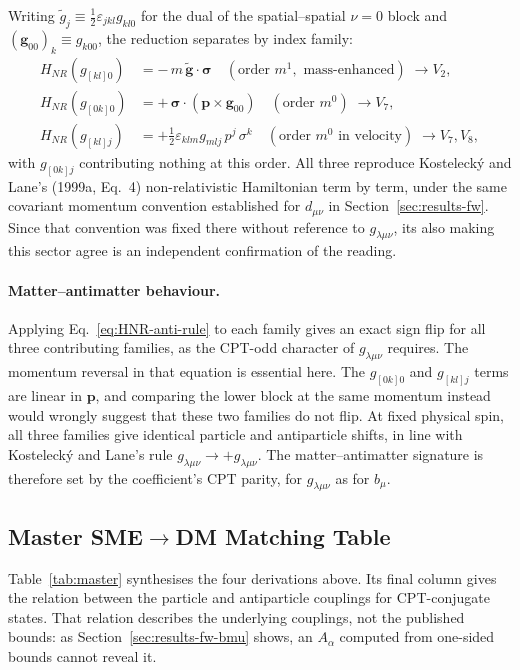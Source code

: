 Writing $\tilde g_j\equiv\tfrac12\varepsilon_{jkl}g_{kl0}$ for the dual of
the spatial--spatial $\nu=0$ block and $(\mathbf g_{00})_k\equiv g_{k00}$,
the reduction separates by index family:
\begin{align}
  H_{NR}(g_{[kl]0}) &= -\,m\,\tilde{\mathbf g}\cdot\boldsymbol\sigma
     \quad (\text{order } m^1,\text{ mass-enhanced}) \;\to V_2, \\
  H_{NR}(g_{[0k]0}) &= +\,\boldsymbol\sigma\cdot(\mathbf p\times\mathbf g_{00})
     \quad (\text{order } m^0) \;\to V_7, \\
  H_{NR}(g_{[kl]j}) &= +\tfrac12\varepsilon_{klm}g_{mlj}\,p^j\,\sigma^k
     \quad (\text{order } m^0 \text{ in velocity}) \;\to V_7, V_8,
\end{align}
with $g_{[0k]j}$ contributing nothing at this order. All three reproduce
Kostelecký and Lane's (1999a, Eq.~4) non-relativistic Hamiltonian term by term, under the
same covariant momentum convention established for $d_{\mu\nu}$ in
Section~\ref{sec:results-fw}. Since that convention was fixed there without
reference to $g_{\lambda\mu\nu}$, its also making this sector agree is an
independent confirmation of the reading.

\paragraph{Matter--antimatter behaviour.} Applying
Eq.~\eqref{eq:HNR-anti-rule} to each family gives an exact sign flip for
all three contributing families, as the CPT-odd character of
$g_{\lambda\mu\nu}$ requires. The momentum reversal in that equation is
essential here. The $g_{[0k]0}$ and $g_{[kl]j}$ terms are linear in
$\mathbf p$, and comparing the lower block at the same momentum instead
would wrongly suggest that these two families do not flip. At fixed
physical spin, all three families give identical particle and antiparticle
shifts, in line with Kostelecký and Lane's rule
$g_{\lambda\mu\nu}\to+g_{\lambda\mu\nu}$. The matter--antimatter signature
is therefore set by the coefficient's CPT parity, for $g_{\lambda\mu\nu}$
as for $b_\mu$.

\subsection{Master SME\texorpdfstring{$\to$}{->}DM Matching Table}
\label{sec:master}

Table~\ref{tab:master} synthesises the four derivations above. Its final
column gives the relation between the particle and antiparticle couplings
for CPT-conjugate states. That relation describes the underlying couplings,
not the published bounds: as Section~\ref{sec:results-fw-bmu} shows, an
$A_\alpha$ computed from one-sided bounds cannot reveal it.

